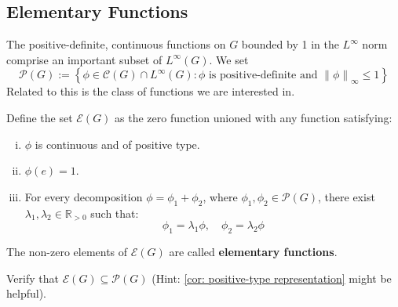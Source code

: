 \documentclass[11pt, x11names]{article}
\newcommand{\rr}{\mathbb{R}}
\newcommand{\fanc}{\mathscr{C}}
\newcommand{\fane}{\mathscr{E}}
\newcommand{\fanp}{\mathscr{P}}
\newcommand{\set}[1]{\left\{ #1 \right\}}
\newcommand{\norm}[1]{\left\lVert #1 \right \rVert}
\begin{document}
\subsection{Elementary Functions}
\label{subsection: Elementary Functions}
The positive-definite, continuous functions on $G$ bounded by 1 in the $L^\infty$ norm comprise an important subset of $L^\infty(G)$. We set 
\begin{equation*}
    \fanp(G) := \set{\phi \in \fanc(G) \cap L^\infty(G) : \phi \text{ is positive-definite and } \norm{\phi}_\infty \leq 1}
\end{equation*}
Related to this is the class of functions we are interested in.
\begin{defn}
    Define the set $\fane(G)$ as the zero function unioned with any function satisfying:
    \begin{enumerate}[(i)]
        \item $\phi$ is continuous and of positive type.
        \item $\phi(e) = 1$.
        \item For every decomposition $\phi = \phi_1 + \phi_2$, where $\phi_1,\phi_2 \in \fanp(G)$, there exist $\lambda_1, \lambda_2 \in \rr_{> 0}$ such that:
        \begin{equation*}
            \phi_1 = \lambda_1 \phi, \quad \phi_2 = \lambda_2 \phi
        \end{equation*}
    \end{enumerate}
    The non-zero elements of $\fane(G)$ are called \textbf{elementary functions}.
\end{defn}

\begin{sanitycheck}
    Verify that $\fane(G) \subseteq \fanp(G)$ (Hint: \ref{cor: positive-type representation} might be helpful).
\end{sanitycheck}
\end{document}
